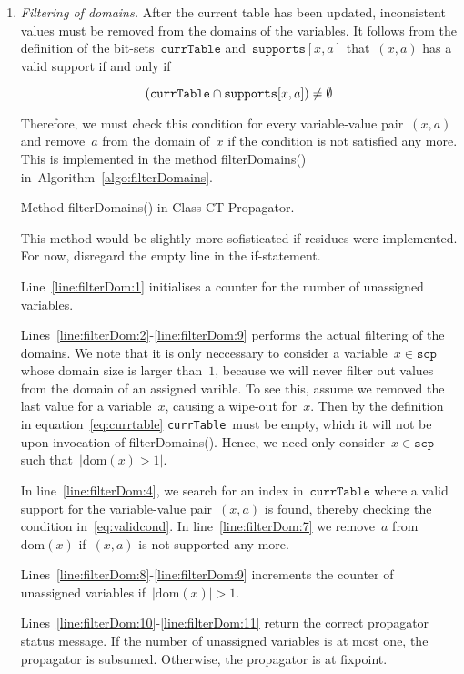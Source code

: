 \documentclass[a4paper,11pt]{article}
\newcommand{\Todo}[1]{{\color{blue}#1}}
\newcommand{\Algoref}[1]{Algorithm~\ref{#1}}
\newcommand{\Lineref}[1]{Line~\ref{#1}}
\newcommand{\Linesref}[2]{Lines~\ref{#1}-\ref{#2}}
\newcommand{\Dom}[1]{\text{dom}({#1})}
\newcommand{\Scp}{\texttt{scp}}
\newcommand{\CurrTable}{\texttt{currTable}}
\newcommand{\Supports}{\texttt{supports}}
\numberwithin{equation}{section}
\begin{document}
\begin{enumerate}
\item 
  \textit{Filtering of domains.}
  After the current table has been updated, inconsistent values must be removed
  from the domains of the variables.   
  It follows from the definition of the bit-sets~$\CurrTable$ and~$\Supports[x,a]$
  that~$(x,a)$ has a valid support if and only if 

  \begin{equation}
    \label{eq:validcond}
    (\CurrTable \Inter \Supports[x,a]) \neq \emptyset
  \end{equation}

  Therefore, we must check this condition for every variable-value pair~$(x,a)$ and
  remove~$a$ from the domain of~$x$ if the condition is not satisfied any more.
  This is implemented in the method filterDomains()
  in~\Algoref{algo:filterDomains}.%

  \begin{algorithm}[H]
    \begin{algorithmic}[1]  %
      
    \end{algorithmic}
    \caption{Method filterDomains() in Class CT-Propagator.}
    \label{algo:filterDomains}
  \end{algorithm}

  \Todo{This method would be slightly more sofisticated if residues
  were implemented. For now, disregard the empty line in the if-statement.}

  \Lineref{line:filterDom:1} initialises a counter for the number of unassigned
  variables.

  \Linesref{line:filterDom:2}{line:filterDom:9} performs the
  actual filtering of the domains. We note that it is only neccessary to
  consider a variable~$x \in \Scp$ whose domain size is larger than~$1$,
  because we will never filter out values from the domain of an assigned
  varible. To see this, assume we removed the last value for a variable~$x$,
  causing a wipe-out for~$x$. Then by the definition in equation~\eqref{eq:currtable}
  \CurrTable~must be empty,
  which it will not be upon invocation of filterDomains(). Hence, we need
  only consider~$x \in \Scp$ such that~$|\Dom{x} > 1|$.

  In line~\ref{line:filterDom:4}, we search for an index in~$\CurrTable$
  where a valid support for the variable-value pair~$(x,a)$ is found, 
  thereby checking the condition in~\eqref{eq:validcond}.
  In line~\ref{line:filterDom:7} we remove~$a$ from~$\Dom{x}$ if~$(x,a)$
  is not supported any more.

  \Linesref{line:filterDom:8}{line:filterDom:9}
  increments the counter of unassigned variables if~$|\Dom{x}| > 1$.

  \Linesref{line:filterDom:10}{line:filterDom:11} return the correct
  propagator status message. If the number of unassigned variables is
  at most one, the propagator is subsumed. Otherwise, the propagator
  is at fixpoint.
  
\end{enumerate}
\end{document}
